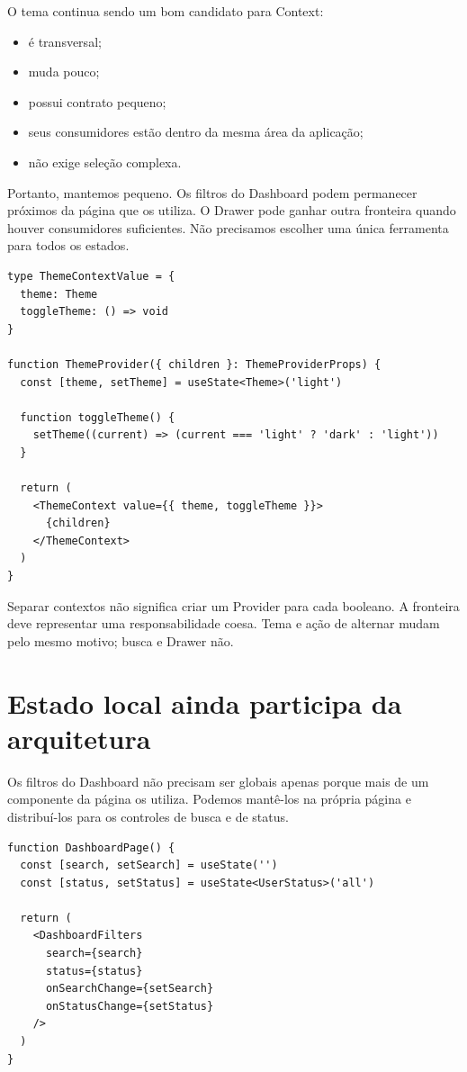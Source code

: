 O tema continua sendo um bom candidato para Context:

\begin{itemize}
  \item é transversal;
  \item muda pouco;
  \item possui contrato pequeno;
  \item seus consumidores estão dentro da mesma área da aplicação;
  \item não exige seleção complexa.
\end{itemize}

Portanto, mantemos  pequeno. Os filtros do Dashboard podem
permanecer próximos da página que os utiliza. O Drawer pode ganhar outra
fronteira quando houver consumidores suficientes. Não precisamos escolher uma
única ferramenta para todos os estados.

\begin{lstlisting}[caption={Um Provider com uma única responsabilidade.}]
type ThemeContextValue = {
  theme: Theme
  toggleTheme: () => void
}

function ThemeProvider({ children }: ThemeProviderProps) {
  const [theme, setTheme] = useState<Theme>('light')

  function toggleTheme() {
    setTheme((current) => (current === 'light' ? 'dark' : 'light'))
  }

  return (
    <ThemeContext value={{ theme, toggleTheme }}>
      {children}
    </ThemeContext>
  )
}
\end{lstlisting}

Separar contextos não significa criar um Provider para cada booleano. A
fronteira deve representar uma responsabilidade coesa. Tema e ação de alternar
mudam pelo mesmo motivo; busca e Drawer não.

\section{Estado local ainda participa da arquitetura}

Os filtros do Dashboard não precisam ser globais apenas porque mais de um
componente da página os utiliza. Podemos mantê-los na própria página e
distribuí-los para os controles de busca e de status.

\begin{lstlisting}
function DashboardPage() {
  const [search, setSearch] = useState('')
  const [status, setStatus] = useState<UserStatus>('all')

  return (
    <DashboardFilters
      search={search}
      status={status}
      onSearchChange={setSearch}
      onStatusChange={setStatus}
    />
  )
}
\end{lstlisting}

